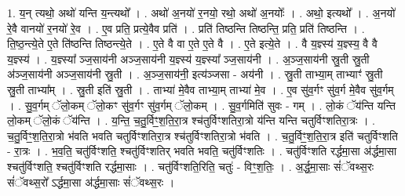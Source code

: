 \documentclass[17pt]{extarticle}
\begin{document}
1. य॒न् त्यथो॒ अथो॑ यन्ति य॒न्त्यथो᳚ । . अथो॑ अ॒नयो॑ र॒नयो॒ रथो॒ अथो॑ अ॒नयोः᳚ । . अथो॒ इत्यथो᳚ । . अ॒नयो॑ रे॒वै वानयो॑ र॒नयो॑ रे॒व । . ए॒व प्रति॒ प्रत्ये॒वैव प्रति॑ । . प्रति॑ तिष्ठन्ति तिष्ठन्ति॒ प्रति॒ प्रति॑ तिष्ठन्ति । . ति॒ष्ठ॒न्त्ये॒ते ए॒ते ति॑ष्ठन्ति तिष्ठन्त्ये॒ते । . ए॒ते वै वा ए॒ते ए॒ते वै । . ए॒ते इत्ये॒ते । . वै य॒ज्ञ्स्य॑ य॒ज्ञ्स्य॒ वै वै य॒ज्ञ्स्य॑ । . य॒ज्ञ्स्या᳚ ञ्ज॒साय॑नी अञ्ज॒साय॑नी य॒ज्ञ्स्य॑ य॒ज्ञ्स्या᳚ ञ्ज॒साय॑नी । . अ॒ञ्ज॒साय॑नी स्रु॒ती स्रु॒ती अ॑ञ्ज॒साय॑नी अञ्ज॒साय॑नी स्रु॒ती । . अ॒ञ्ज॒साय॑नी॒ इत्य॑ञ्जसा - अय॑नी । . स्रु॒ती ताभ्या॒म् ताभ्याꣳ॑ स्रु॒ती स्रु॒ती ताभ्या᳚म् । . स्रु॒ती इति॑ स्रु॒ती । . ताभ्या॑ मे॒वैव ताभ्या॒म् ताभ्या॑ मे॒व । . ए॒व सु॑व॒र्गꣳ सु॑व॒र्ग मे॒वैव सु॑व॒र्गम् । . सु॒व॒र्गम् ॅलो॒कम् ॅलो॒कꣳ सु॑व॒र्गꣳ सु॑व॒र्गम् ॅलो॒कम् । . सु॒व॒र्गमिति॑ सुवः - गम् । . लो॒कं ॅय॑न्ति यन्ति लो॒कम् ॅलो॒कं ॅय॑न्ति । . य॒न्ति॒ च॒तु॒र्विꣳ॒॒श॒ति॒रा॒त्र श्च॑तुर्विꣳशतिरा॒त्रो य॑न्ति यन्ति चतुर्विꣳशतिरा॒त्रः । . च॒तु॒र्विꣳ॒॒श॒ति॒रा॒त्रो भ॑वति भवति चतुर्विꣳशतिरा॒त्र श्च॑तुर्विꣳशतिरा॒त्रो भ॑वति । . च॒तु॒र्विꣳ॒॒श॒ति॒रा॒त्र इति॑ चतुर्विꣳशति - रा॒त्रः । . भ॒व॒ति॒ चतु॑र्विꣳशति॒ श्चतु॑र्विꣳशतिर् भवति भवति॒ चतु॑र्विꣳशतिः । . चतु॑र्विꣳशति रर्द्धमा॒सा अ॑र्द्धमा॒सा श्चतु॑र्विꣳशति॒ श्चतु॑र्विꣳशति रर्द्धमा॒साः । . चतु॑र्विꣳशति॒रिति॒ चतुः॑ - विꣳ॒॒श॒तिः॒ । . अ॒र्द्ध॒मा॒साः सं॑ॅवथ्स॒रः सं॑ॅवथ्स॒रो᳚ ऽर्द्धमा॒सा अ॑र्द्धमा॒साः सं॑ॅवथ्स॒रः । \newline
\end{document}
